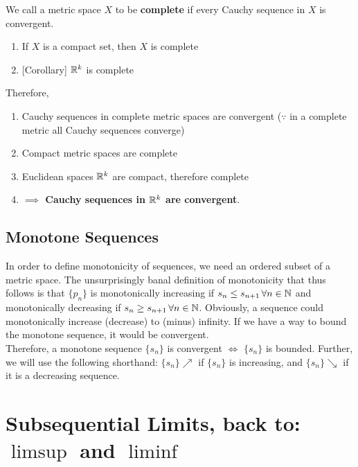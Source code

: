 \begin{definition}
We call a metric space $X$ to be \textbf{complete} if every Cauchy sequence in $X$ is convergent.
\end{definition}

\begin{theorem}
\begin{enumerate}[label=(\roman*)]
\item If $X$ is a compact set, then $X$ is complete
\item {[Corollary]} $\mathbb{R}^k$ is complete
\end{enumerate}
\end{theorem}
Therefore,
\begin{enumerate}[label=C\arabic*.]
\item Cauchy sequences in complete metric spaces are convergent ($\because$ in a complete metric all Cauchy sequences converge)
\item Compact metric spaces are complete
\item Euclidean spaces $\mathbb{R}^k$ are compact, therefore complete
\item \textbf{$\implies$ Cauchy sequences in $\mathbb{R}^k$ are convergent}.
\end{enumerate}

\subsection{Monotone Sequences}
In order to define monotonicity of sequences, we need an ordered subset of a metric space. The unsurprisingly banal definition of monotonicity that thus follows is that $\{p_n\}$ is monotonically increasing if $s_n\leq s_{n+1}\,\forall n\in \mathbb{N}$ and monotonically decreasing if $s_n \geq s_{n+1}\,\forall n\in\mathbb{N}$. Obviously, a sequence could monotonically increase (decrease) to (minus) infinity. If we have a way to bound the monotone sequence, it would be convergent. \\

Therefore, a monotone sequence $\{s_n\}$ is convergent $\iff$ $\{s_n\}$ is bounded. Further, we will use the following shorthand: $\{s_n\}\nearrow$ if $\{s_n\}$ is increasing, and $\{s_n\}\searrow$ if it is a decreasing sequence.

\section{Subsequential Limits, back to: $\limsup$ and $\liminf$}

